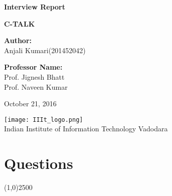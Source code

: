 \documentclass[12pt]{article}
\def\mydate{October 21, 2016}
\begin{document}
	
	\begin{titlepage}
		\begin{center}
			
			
			\LARGE{\textbf{Interview Report}}
			
			\vspace{1.5cm}
			
			\textbf{C-TALK}\\
			
			\vspace{2cm}
		 
        \large{\textbf{Author:}}
			  \large{ \\ Anjali Kumari(201452042)\\}
			 
			 \vspace{1.5cm} 
			  
		\large{\textbf{Professor Name:}}
			  \large{ \\ Prof. Jignesh Bhatt\\ Prof. Naveen Kumar}
			  
			\vspace{1.5cm}
			\mydate{}
			
			
			\vspace{4cm}
			\texttt{[image: IIIt\_logo.png]} \\
			\Large{Indian Institute of Information Technology Vadodara} \\
			
		\end{center}
	\end{titlepage}
	
	\vspace{2em}
	

	
	\newpage


\section{Questions}

\begin{center}
\line(1,0){2500}
\end{center}
\end{document}
